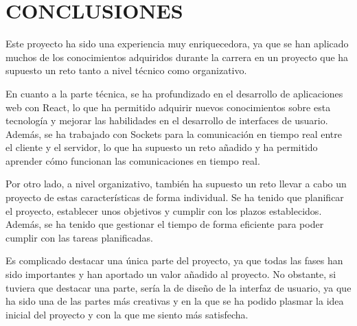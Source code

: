 \section{CONCLUSIONES}
Este proyecto ha sido una experiencia muy enriquecedora, ya que se han aplicado muchos de los conocimientos adquiridos durante la carrera en un proyecto 
que ha supuesto un reto tanto a nivel técnico como organizativo.

En cuanto a la parte técnica, se ha profundizado en el desarrollo de aplicaciones web con React, lo que ha permitido adquirir nuevos conocimientos
sobre esta tecnología y mejorar las habilidades en el desarrollo de interfaces de usuario. Además, se ha trabajado con Sockets para la comunicación en tiempo real
entre el cliente y el servidor, lo que ha supuesto un reto añadido y ha permitido aprender cómo funcionan las comunicaciones en tiempo real.

Por otro lado, a nivel organizativo, también ha supuesto un reto llevar a cabo un proyecto de estas características de forma individual.
Se ha tenido que planificar el proyecto, establecer unos objetivos y cumplir con los plazos establecidos. Además, se ha tenido que gestionar el tiempo
de forma eficiente para poder cumplir con las tareas planificadas.


Es complicado destacar una única parte del proyecto, ya que todas las fases han sido importantes y han aportado un valor añadido al proyecto.
No obstante, si tuviera que destacar una parte, sería la de diseño de la interfaz de usuario, ya que ha sido una de las partes más creativas y en la que
se ha podido plasmar la idea inicial del proyecto y con la que me siento más satisfecha.




